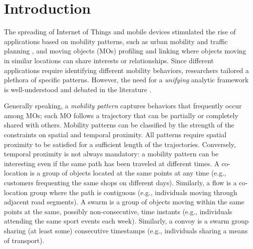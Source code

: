 \documentclass[
]{ceurart}
\begin{document}
\section{Introduction}\label{sec:intro}
The spreading of Internet of Things and mobile devices \citep{vitali2021crop} stimulated the rise of applications based on mobility patterns, such as urban mobility and traffic planning \citep{DBLP:journals/tits/KumarWRLKP18}, and moving objects (MOs) profiling and linking \citep{francia2020dart} where objects moving in similar locations can share interests or relationships.
Since different applications require identifying different mobility behaviors, researchers tailored a plethora of specific patterns.
However, the need for a \textit{unifying} analytic framework is well-understood and debated in the literature \citep{DBLP:journals/pvldb/DingCGJB18,DBLP:journals/jdwm/Kwakye20}.

Generally speaking, a \textit{mobility pattern} captures behaviors that frequently occur among MOs; each MO follows a trajectory that can be partially or completely shared with others.
Mobility patterns can be classified by the strength of the constraints on spatial and temporal proximity.
All patterns require spatial proximity to be satisfied for a sufficient length of the trajectories.
Conversely, temporal proximity is not always mandatory: a mobility pattern can be interesting even if the same path has been traveled at different times.
A co-location \citep{bao2021mining} is a group of objects located at the same points at any time (e.g., customers frequenting the same shops on different days).
Similarly, a flow \citep{DBLP:journals/tmc/HanLO15} is a co-location group where the path is contiguous (e.g., individuals moving through adjacent road segments).
A swarm \citep{DBLP:journals/pvldb/LiDHK10} is a group of objects moving within the same points at the same, possibly non-consecutive, time instants (e.g., individuals attending the same sport events each week).
Similarly, a convoy \citep{DBLP:journals/pvldb/JeungYZJS08} is a swarm group sharing (at least some) consecutive timestamps (e.g., individuals sharing a means of transport).
\end{document}
